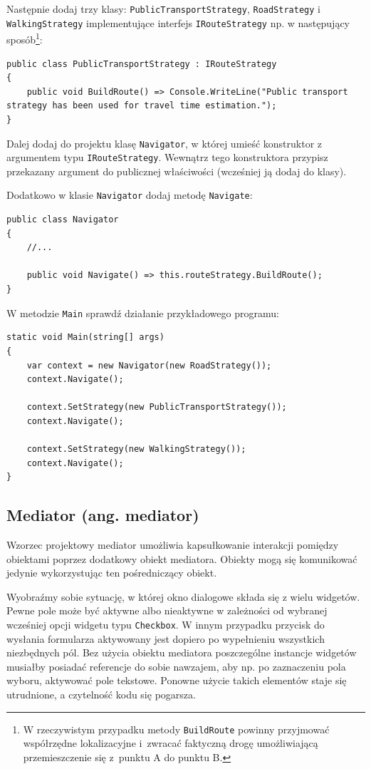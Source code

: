 Następnie dodaj trzy klasy: \texttt{PublicTransportStrategy}, \texttt{RoadStrategy} i \texttt{WalkingStrategy} implementujące interfejs \texttt{IRouteStrategy} np. w następujący sposób\footnote{W rzeczywistym przypadku metody \texttt{BuildRoute} powinny przyjmować współrzędne lokalizacyjne i~zwracać faktyczną drogę umożliwiającą przemieszczenie się z~punktu A do punktu B.}:
\begin{lstlisting}
public class PublicTransportStrategy : IRouteStrategy
{
	public void BuildRoute() => Console.WriteLine("Public transport strategy has been used for travel time estimation.");
}
\end{lstlisting}

Dalej dodaj do projektu klasę \texttt{Navigator}, w której umieść konstruktor z argumentem typu \texttt{IRouteStrategy}. Wewnątrz tego konstruktora przypisz przekazany argument do publicznej właściwości (wcześniej ją dodaj do klasy). 

Dodatkowo w klasie \texttt{Navigator} dodaj metodę \texttt{Navigate}:
\begin{lstlisting}
public class Navigator
{
	//...
	
	public void Navigate() => this.routeStrategy.BuildRoute(); 
}
\end{lstlisting}

W metodzie \texttt{Main} sprawdź działanie przykładowego programu:
\begin{lstlisting}
static void Main(string[] args)
{
	var context = new Navigator(new RoadStrategy());
	context.Navigate();
	
	context.SetStrategy(new PublicTransportStrategy());
	context.Navigate();
	
	context.SetStrategy(new WalkingStrategy());
	context.Navigate();
}
\end{lstlisting}

\subsection{Mediator (ang. mediator)}

Wzorzec projektowy mediator umożliwia kapsułkowanie interakcji pomiędzy obiektami poprzez dodatkowy obiekt mediatora. Obiekty mogą się komunikować jedynie wykorzystując ten pośredniczący obiekt.


Wyobraźmy sobie sytuację, w której okno dialogowe składa się z wielu widgetów. Pewne pole może być aktywne albo nieaktywne w zależności od wybranej wcześniej opcji widgetu typu \texttt{Checkbox}. W innym przypadku przycisk do wysłania formularza aktywowany jest dopiero po wypełnieniu wszystkich niezbędnych pól. Bez użycia obiektu mediatora poszczególne instancje widgetów musiałby posiadać referencje do sobie nawzajem, aby np. po zaznaczeniu pola wyboru, aktywować pole tekstowe. Ponowne użycie takich elementów staje się utrudnione, a czytelność kodu się pogarsza.


